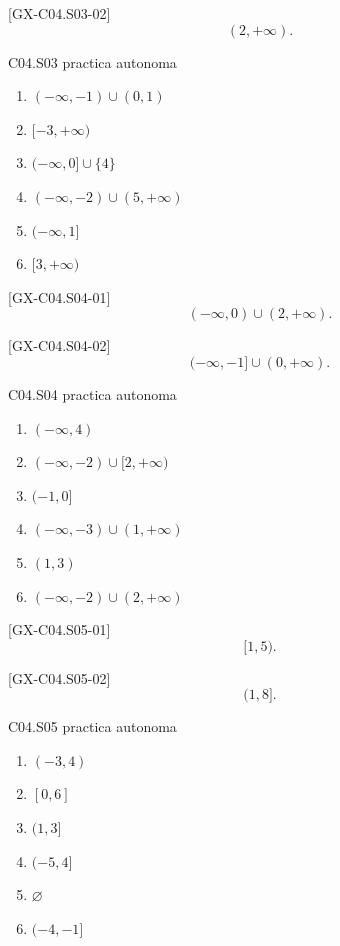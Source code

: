 \begin{shortanswer}{[GX-C04.S03-02]}
\[
(2,+\infty).
\]
\end{shortanswer}

\begin{shortanswer}{C04.S03 practica autonoma}
\begin{enumerate}[label=\textbf{PX-C04.S03-\arabic*:}, leftmargin=*]
  \item \((-\infty,-1)\cup (0,1)\)
  \item \([-3,+\infty)\)
  \item \((-\infty,0]\cup \{4\}\)
  \item \((-\infty,-2)\cup (5,+\infty)\)
  \item \((-\infty,1]\)
  \item \([3,+\infty)\)
\end{enumerate}
\end{shortanswer}

\begin{shortanswer}{[GX-C04.S04-01]}
\[
(-\infty,0)\cup (2,+\infty).
\]
\end{shortanswer}

\begin{shortanswer}{[GX-C04.S04-02]}
\[
(-\infty,-1]\cup (0,+\infty).
\]
\end{shortanswer}

\begin{shortanswer}{C04.S04 practica autonoma}
\begin{enumerate}[label=\textbf{PX-C04.S04-\arabic*:}, leftmargin=*]
  \item \((-\infty,4)\)
  \item \((-\infty,-2)\cup [2,+\infty)\)
  \item \((-1,0]\)
  \item \((-\infty,-3)\cup (1,+\infty)\)
  \item \((1,3)\)
  \item \((-\infty,-2)\cup (2,+\infty)\)
\end{enumerate}
\end{shortanswer}

\begin{shortanswer}{[GX-C04.S05-01]}
\[
[1,5).
\]
\end{shortanswer}

\begin{shortanswer}{[GX-C04.S05-02]}
\[
(1,8].
\]
\end{shortanswer}

\begin{shortanswer}{C04.S05 practica autonoma}
\begin{enumerate}[label=\textbf{PX-C04.S05-\arabic*:}, leftmargin=*]
  \item \((-3,4)\)
  \item \([0,6]\)
  \item \((1,3]\)
  \item \((-5,4]\)
  \item \(\varnothing\)
  \item \((-4,-1]\)
\end{enumerate}
\end{shortanswer}

